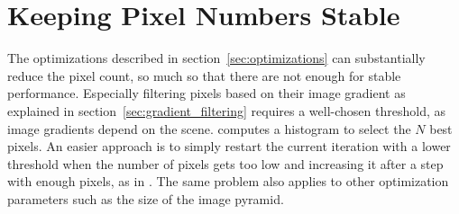 \section{Keeping Pixel Numbers Stable}

The optimizations described in section~\ref{sec:optimizations} can
substantially reduce the pixel count, so much so that there are not enough for
stable performance. Especially filtering pixels based on their image gradient
as explained in section~\ref{sec:gradient_filtering} requires a well-chosen
threshold, as image gradients depend on the scene. \cite{comport2007odometry}
computes a histogram to select the $N$ best pixels. An easier approach is to
simply restart the current iteration with a lower threshold when the number of
pixels gets too low and increasing it after a step with enough pixels, as in
\cite{omaridenseodometry}. The same problem also applies to other optimization
parameters such as the size of the image pyramid.
